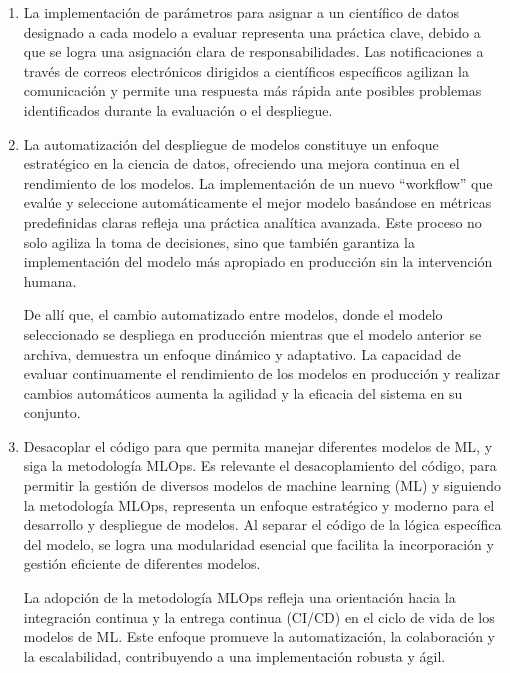 \begin{enumerate}
	\item La implementación de parámetros para asignar a un científico de datos designado a cada modelo a evaluar representa una práctica clave, debido a que se logra una asignación clara de responsabilidades. Las notificaciones a través de correos electrónicos dirigidos a científicos específicos agilizan la comunicación y permite una respuesta más rápida ante posibles problemas identificados durante la evaluación o el despliegue.

	\item La automatización del despliegue de modelos constituye un enfoque estratégico en la ciencia de datos, ofreciendo una mejora continua en el rendimiento de los modelos. La implementación de un nuevo “workflow” que evalúe y seleccione automáticamente el mejor modelo basándose en métricas predefinidas claras refleja una práctica analítica avanzada. Este proceso no solo agiliza la toma de decisiones, sino que también garantiza la implementación del modelo más apropiado en producción sin la intervención humana.

	De allí que, el cambio automatizado entre modelos, donde el modelo seleccionado se despliega en producción mientras que el modelo anterior se archiva, demuestra un enfoque dinámico y adaptativo. La capacidad de evaluar continuamente el rendimiento de los modelos en producción y realizar cambios automáticos aumenta la agilidad y la eficacia del sistema en su conjunto.

	\item Desacoplar el código para que permita manejar diferentes modelos de ML, y siga la metodología MLOps. Es relevante el desacoplamiento del código, para permitir la gestión de diversos modelos de machine learning (ML) y siguiendo la metodología MLOps, representa un enfoque estratégico y moderno para el desarrollo y despliegue de modelos. Al separar el código de la lógica específica del modelo, se logra una modularidad esencial que facilita la incorporación y gestión eficiente de diferentes modelos.

	La adopción de la metodología MLOps refleja una orientación hacia la integración continua y la entrega continua (CI/CD) en el ciclo de vida de los modelos de ML. Este enfoque promueve la automatización, la colaboración y la escalabilidad, contribuyendo a una implementación robusta y ágil.
\end{enumerate}


